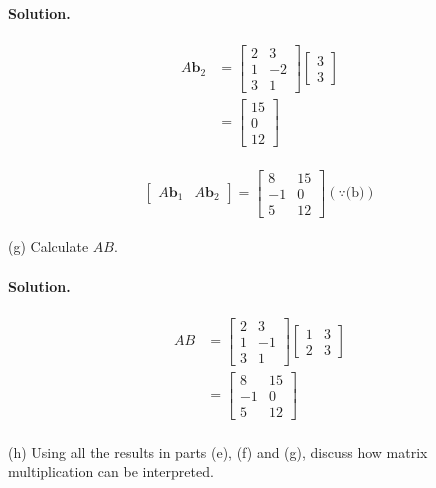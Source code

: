 \paragraph{Solution.}
\begin{align*}
    A\mathbf{b}_2 &= \begin{bmatrix}
        2&3\\1&-2\\3&1
    \end{bmatrix}\begin{bmatrix}
        3\\3
    \end{bmatrix}\\&=\begin{bmatrix}
        15\\0\\12
    \end{bmatrix}
\end{align*}\\
$$\begin{bmatrix}
    A\mathbf{b}_1&A\mathbf{b}_2
\end{bmatrix} = \begin{bmatrix}
    8&15\\-1&0\\5&12
\end{bmatrix} (\because \text{(b)})$$\\

(g) Calculate $AB$.
\paragraph{Solution.}
\begin{align*}
    AB &= \begin{bmatrix}
        2&3\\1&-1\\3&1
    \end{bmatrix}\begin{bmatrix}
        1&3\\2&3
    \end{bmatrix}\\
    &=\begin{bmatrix}
        8&15\\-1&0\\5&12
    \end{bmatrix}
\end{align*}\\

(h) Using all the results in parts (e), (f) and (g), discuss how matrix multiplication can be interpreted.
